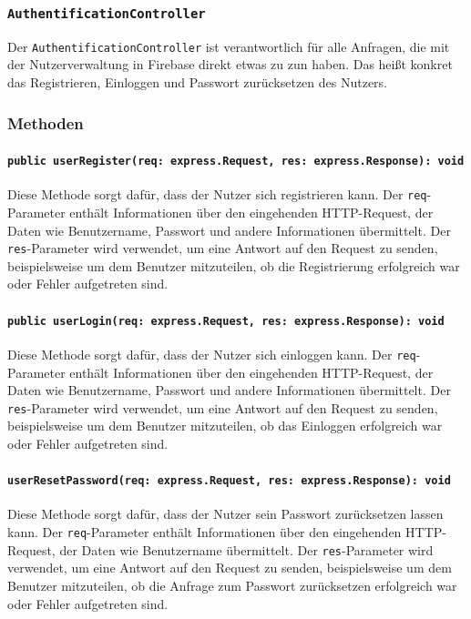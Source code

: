 \documentclass{entwurfsheft}
\begin{document}
\subsubsection{\texttt{AuthentificationController}}\label{sec:AuthentificationController}
Der \texttt{AuthentificationController} ist verantwortlich für alle Anfragen, die mit der Nutzerverwaltung in Firebase direkt etwas zu zun haben. Das heißt konkret das Registrieren, Einloggen und Passwort zurücksetzen des Nutzers.
\subsubsection*{Methoden}
\paragraph{\texttt{public userRegister(req: express.Request, res: express.Response): void}}

Diese Methode sorgt dafür, dass der Nutzer sich registrieren kann. Der \texttt{req}-Parameter enthält Informationen über den eingehenden HTTP-Request, der Daten wie Benutzername, Passwort und andere Informationen übermittelt. Der \texttt{res}-Parameter wird verwendet, um eine Antwort auf den Request zu senden, beispielsweise um dem Benutzer mitzuteilen, ob die Registrierung erfolgreich war oder Fehler aufgetreten sind.
\paragraph{\texttt{public userLogin(req: express.Request, res: express.Response): void}}
Diese Methode sorgt dafür, dass der Nutzer sich einloggen kann. Der \texttt{req}-Parameter enthält Informationen über den eingehenden HTTP-Request, der Daten wie Benutzername, Passwort und andere Informationen übermittelt. Der \texttt{res}-Parameter wird verwendet, um eine Antwort auf den Request zu senden, beispielsweise um dem Benutzer mitzuteilen, ob das Einloggen erfolgreich war oder Fehler aufgetreten sind. 
\paragraph{\texttt{userResetPassword(req: express.Request, res: express.Response): void}}
Diese Methode sorgt dafür, dass der Nutzer sein Passwort zurücksetzen lassen kann. Der \texttt{req}-Parameter enthält Informationen über den eingehenden HTTP-Request, der Daten wie Benutzername übermittelt. Der \texttt{res}-Parameter wird verwendet, um eine Antwort auf den Request zu senden, beispielsweise um dem Benutzer mitzuteilen, ob die Anfrage zum Passwort zurücksetzen erfolgreich war oder Fehler aufgetreten sind. 
\end{document}
